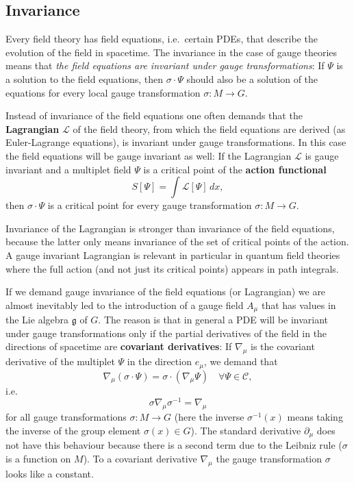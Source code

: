 \documentclass[12pt]{amsart}
\theoremstyle{definition}
\theoremstyle{remark}
\numberwithin{equation}{section}
\begin{document}
\subsection{Invariance}
Every field theory has field equations, i.e.~certain PDEs, that describe the evolution of the field in spacetime. The invariance in the case of gauge theories means that {\em the field equations are invariant under gauge transformations}: If $\Psi$ is a solution to the field equations, then $\sigma\cdot\Psi$ should also be a solution of the equations for every local gauge transformation $\sigma\colon M\rightarrow G$.

Instead of invariance of the field equations one often demands that the {\bf Lagrangian} $\mathcal{L}$ of the field theory, from which the field equations are derived (as Euler-Lagrange equations), is invariant under gauge transformations. In this case the field equations will be gauge invariant as well: If the Lagrangian $\mathcal{L}$ is gauge invariant and a multiplet field $\Psi$ is a critical point of the {\bf action functional}
\begin{equation*}
S[\Psi]=\int\mathcal{L}[\Psi]\,dx,
\end{equation*}
then $\sigma\cdot\Psi$ is a critical point for every gauge transformation $\sigma\colon M\rightarrow G$.

Invariance of the Lagrangian is stronger than invariance of the field equations, because the latter only means invariance of the set of critical points of the action. A gauge invariant Lagrangian is relevant in particular in quantum field theories where the full action (and not just its critical points) appears in path integrals.

If we demand gauge invariance of the field equations (or Lagrangian) we are almost inevitably led to the introduction of a gauge field $A_\mu$ that has values in the Lie algebra $\mathfrak{g}$ of $G$. The reason is that in general a PDE will be invariant under gauge transformations only if the partial derivatives of the field in the directions of spacetime are {\bf covariant derivatives}: If $\nabla_\mu$ is the covariant derivative of the multiplet $\Psi$ in the direction $e_\mu$, we demand that 
\begin{equation*}
\nabla_\mu(\sigma\cdot\Psi)=\sigma\cdot(\nabla_\mu\Psi)\quad\forall\Psi\in\mathcal{C},
\end{equation*}
i.e. 
\begin{equation*}
\sigma\nabla_\mu \sigma^{-1}=\nabla_\mu
\end{equation*} 
for all gauge transformations $\sigma\colon M\rightarrow G$ (here the inverse $\sigma^{-1}(x)$ means taking the inverse of the group element $\sigma(x)\in G$). The standard derivative $\partial_\mu$ does not have this behaviour because there is a second term due to the Leibniz rule ($\sigma$ is a function on $M$). To a covariant derivative $\nabla_\mu$ the gauge transformation $\sigma$ looks like a constant.
 
\end{document}
